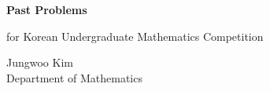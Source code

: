 \documentclass[11pt,oneside]{article}
\begin{document}
\thispagestyle{empty}

\begin{center}
    \vspace*{1.1cm}

    {\LARGE\bfseries Past Problems\par}

    \vspace{0.25cm}

    {\large for Korean Undergraduate Mathematics Competition\par}

    \vspace{0.75cm}

    {\normalsize
    Jungwoo Kim\\
    Department of Mathematics\\
    \PohangUniversityOfScienceAndTechnology
    \par}
\end{center}

\vspace{0.45cm}

























\end{document}

